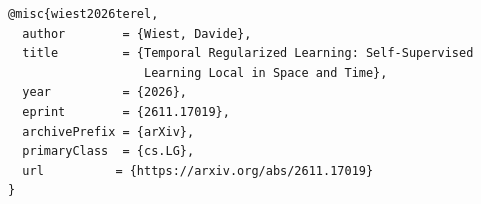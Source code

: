 \documentclass[11pt]{article}
\begin{document}
\makepublicationlinks

\begin{publicationcitation}
\begin{verbatim}
@misc{wiest2026terel,
  author        = {Wiest, Davide},
  title         = {Temporal Regularized Learning: Self-Supervised
                   Learning Local in Space and Time},
  year          = {2026},
  eprint        = {2611.17019},
  archivePrefix = {arXiv},
  primaryClass  = {cs.LG},
  url          = {https://arxiv.org/abs/2611.17019}
}
\end{verbatim}
\end{publicationcitation}
\end{document}
